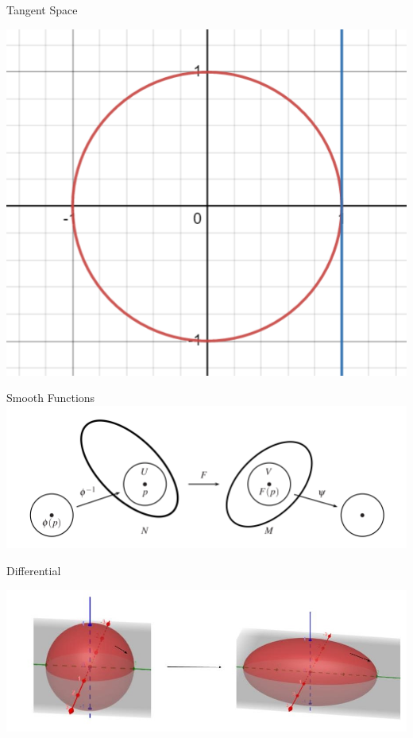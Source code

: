 \documentclass[9pt]{beamer}
\begin{document}
\begin{frame}{Tangent Space}
    \begin{center}
        
    \includegraphics[scale=0.5]{tangent.PNG}
    \end{center}
\end{frame}

\begin{frame}{Smooth Functions}
    \includegraphics[scale=0.55]{smooth_function.PNG}
\end{frame}



\begin{frame}{Differential}

    \includegraphics[scale=0.45]{Untitled drawing.jpg}
\end{frame}
\end{document}
